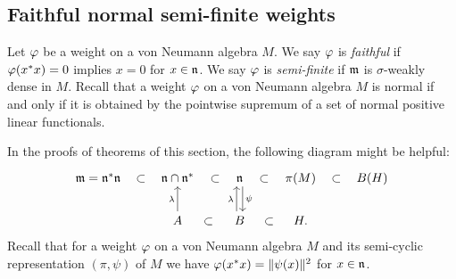 \documentclass{../../small}
\begin{document}
\subsection{Faithful normal semi-finite weights}

\begin{defn}
Let $\varphi$ be a weight on a von Neumann algebra $M$.
We say $\varphi$ is \emph{faithful} if $\varphi(x^*x)=0$ implies $x=0$ for $x\in\mathfrak{n}$.
We say $\varphi$ is \emph{semi-finite} if $\mathfrak{m}$ is $\sigma$-weakly dense in $M$.
Recall that a weight $\varphi$ on a von Neumann algebra $M$ is normal if and only if it is obtained by the pointwise supremum of a set of normal positive linear functionals.
\end{defn}

In the proofs of theorems of this section, the following diagram might be helpful: 
\[\begin{tikzcd}
\fm=\fn^*\fn \rar[phantom,"\subset"] & \fn\cap\fn^* \rar[phantom,"\subset"] & \fn \rar[phantom,"\subset"]\dar[shift left]{\psi} & \pi(M) \rar[phantom,"\subset"] & B(H)\\
& A \rar[phantom,"\subset"]\uar{\lambda} & B \rar[phantom,"\subset"]\uar[shift left]{\lambda} & H.
\end{tikzcd}\]
Recall that for a weight $\varphi$ on a von Neumann algebra $M$ and its semi-cyclic representation $(\pi,\psi)$ of $M$ we have $\varphi(x^*x)=\|\psi(x)\|^2$ for $x\in\mathfrak{n}$.
\end{document}
